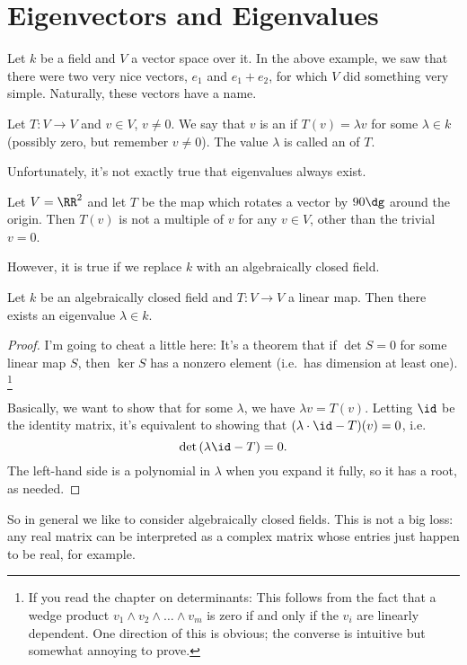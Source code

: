 \section{Eigenvectors and Eigenvalues}
Let $k$ be a field and $V$ a vector space over it.
In the above example, we saw that there were two very nice
vectors, $e_1$ and $e_1+e_2$, for which $V$ did something very simple.
Naturally, these vectors have a name.
\begin{definition}
	Let $T : V \to V$ and $v \in V$, $v \neq 0$.
	We say that $v$ is an  if $T(v) = \lambda v$
	for some $\lambda \in k$ (possibly zero, but remember $v \neq 0$).
	The value $\lambda$ is called an  of $T$.
\end{definition}

Unfortunately, it's not exactly true that eigenvalues always exist.
\begin{example}
	Let $V = \RR^2$ and let $T$ be the map which rotates a vector by $90\dg$
	around the origin.
	Then $T(v)$ is not a multiple of $v$ for any $v \in V$, other than the trivial $v=0$.
\end{example}

However, it is true if we replace $k$ with an algebraically closed field.
\begin{theorem}
	Let $k$ be an algebraically closed field and $T : V \to V$ a linear map.
	Then there exists an eigenvalue $\lambda \in k$.
\end{theorem}
\begin{proof}
	I'm going to cheat a little here:
	It's a theorem that if $\det S = 0$ for some linear map $S$,
	then $\ker S$ has a nonzero element (i.e.\ has dimension at least one).%
	\footnote{
		If you read the chapter on determinants:
		This follows from the fact that a wedge product
		$v_1 \wedge v_2 \wedge \dots \wedge v_m$ is zero
		if and only if the $v_i$ are linearly dependent.
		One direction of this is obvious; the converse is intuitive
		but somewhat annoying to prove.
	}

	Basically, we want to show that for some $\lambda$, we have
	$\lambda v = T(v)$.
	Letting $\id$ be the identity matrix, it's equivalent to showing that
	$(\lambda \cdot \id - T)(v) = 0$, i.e.\
	\[ \det \left( \lambda \id - T \right) = 0. \]
	The left-hand side is a polynomial in $\lambda$ when you expand it fully,
	so it has a root, as needed.
\end{proof}
So in general we like to consider algebraically closed fields.
This is not a big loss: any real matrix can be interpreted as a complex matrix
whose entries just happen to be real, for example.

